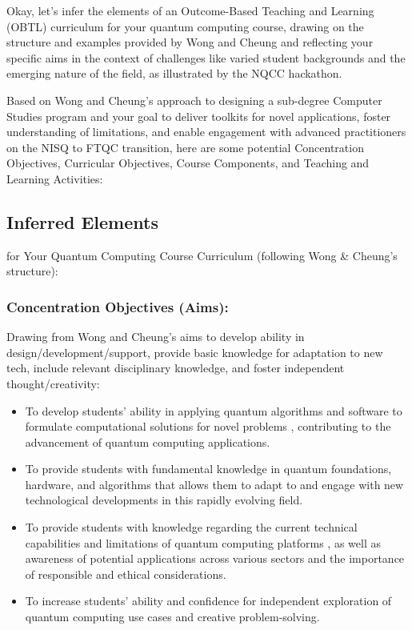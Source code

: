 \documentclass[11pt,a4paper]{article}
\begin{document}
Okay, let's infer the elements of an Outcome-Based Teaching and Learning (OBTL) curriculum for your quantum computing course, drawing on the structure and examples provided by Wong and Cheung and reflecting your specific aims in the context of challenges like varied student backgrounds and the emerging nature of the field, as illustrated by the NQCC hackathon.

Based on Wong and Cheung's approach to designing a sub-degree Computer Studies program
and your goal to deliver toolkits for novel applications, foster understanding of limitations, and enable engagement with advanced practitioners on the NISQ to FTQC transition, here are some potential Concentration Objectives, Curricular Objectives, Course Components, and Teaching and Learning Activities:

\subsection{Inferred Elements}

for Your Quantum Computing Course Curriculum (following Wong \& Cheung's structure):

\subsubsection{Concentration Objectives (Aims):}

Drawing from Wong and Cheung's aims to develop ability in design/development/support, provide basic knowledge for adaptation to new tech, include relevant disciplinary knowledge, and foster independent thought/creativity:


\begin{itemize}	

\item To develop students' ability in applying quantum algorithms and software to formulate computational solutions for novel problems
, contributing to the advancement of quantum computing applications.

\item To provide students with fundamental knowledge in quantum foundations, hardware, and algorithms
that allows them to adapt to and engage with new technological developments in this rapidly evolving field.

\item To provide students with knowledge regarding the current technical capabilities and limitations of quantum computing platforms
, as well as awareness of potential applications across various sectors and the importance of responsible and ethical considerations.

\item To increase students' ability and confidence for independent exploration of quantum computing use cases and creative problem-solving.

\end{itemize}	
\end{document}
